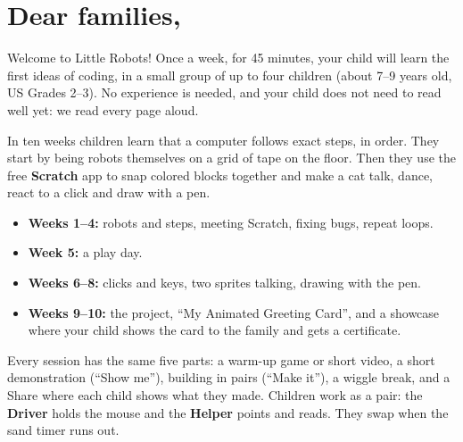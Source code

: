 \documentclass[track=junior,level=1]{kidscode}
\begin{document}

\section{Dear families,}
Welcome to Little Robots! Once a week, for 45 minutes, your child will learn the first ideas of
coding, in a small group of up to four children (about 7--9 years old, US Grades 2--3). No
experience is needed, and your child does not need to read well yet: we read every page aloud.

In ten weeks children learn that a computer follows exact steps, in order. They start by being
robots themselves on a grid of tape on the floor. Then they use the free \textbf{Scratch} app to
snap colored blocks together and make a cat talk, dance, react to a click and draw with a pen.
\begin{itemize}[itemsep=2pt]
  \item \textbf{Weeks 1--4:} robots and steps, meeting Scratch, fixing bugs, repeat loops.
  \item \textbf{Week 5:} a play day.
  \item \textbf{Weeks 6--8:} clicks and keys, two sprites talking, drawing with the pen.
  \item \textbf{Weeks 9--10:} the project, \enquote{My Animated Greeting Card}, and a showcase
        where your child shows the card to the family and gets a certificate.
\end{itemize}
Every session has the same five parts: a warm-up game or short video, a short demonstration
(\enquote{Show me}), building in pairs (\enquote{Make it}), a wiggle break, and a Share where each
child shows what they made. Children work as a pair: the \textbf{Driver} holds the mouse and the
\textbf{Helper} points and reads. They swap when the sand timer runs out.
\end{document}
